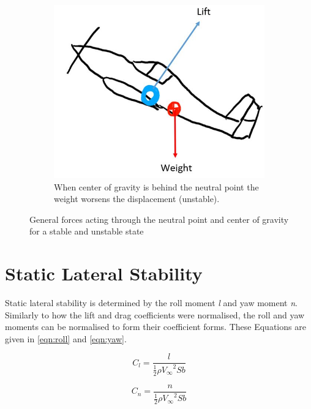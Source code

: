 \begin{figure}[H]
\begin{subfigure}[b]{0.45\textwidth}
         \includegraphics[width=\textwidth]{02_Background/Figs/b3.JPG}
         \caption{When center of gravity is behind the neutral point the weight worsens the displacement (unstable). }
         \label{fig:Pressa2b}
     \end{subfigure}
     \hfill
        \caption{General forces acting through the neutral point and center of gravity for a stable and unstable state}
    \label{fig:stable}
\end{figure}




\section{Static Lateral Stability}

Static lateral stability is determined by the roll moment \textit{l} and yaw moment \textit{n}. Similarly to how the lift and drag coefficients were normalised, the roll and yaw moments can be normalised to form their coefficient forms. These Equations are given in \ref{eqn:roll} and \ref{eqn:yaw}. 

\begin{equation}
    C_l = \frac{l}{\frac{1}{2} \rho {V_\infty}^2 S b }
    \label{eqn:roll}
\end{equation}

\begin{equation}
    C_n = \frac{n}{\frac{1}{2} \rho {V_\infty}^2 S b }
    \label{eqn:yaw}
\end{equation}


